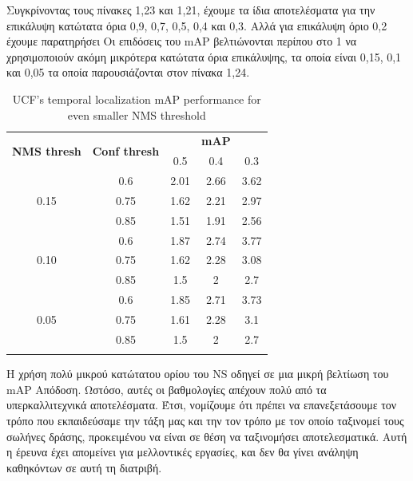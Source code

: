 \documentclass{report}
\begin{document}
Συγκρίνοντας τους πίνακες 1,23 και 1,21, έχουμε τα ίδια αποτελέσματα για την επικάλυψη
κατώτατα όρια 0,9, 0,7, 0,5, 0,4 και 0,3. Αλλά για επικάλυψη όριο 0,2 έχουμε παρατηρήσει
Οι επιδόσεις του mAP βελτιώνονται περίπου στο 1%
να χρησιμοποιούν ακόμη μικρότερα κατώτατα όρια επικάλυψης, τα οποία είναι 0,15, 0,1 και 0,05 τα οποία
παρουσιάζονται στον πίνακα 1,24.

\begin{center}
  \begin{longtable}{|| c | c | c c c||}
    \hline
    \multirow{2}{*}{\textbf{NMS thresh}} & \multirow{2}{*}{\textbf{Conf thresh}} & {} & \textbf{mAP} & {} \\
    {} & {} & 0.5 & 0.4 & 0.3 \\
    \hline
    \multirow{3}{*}{0.15} & 0.6 & 2.01 & 2.66 & 3.62 \\
    \cline{2-5}
    {} & 0.75 & 1.62 & 2.21 & 2.97 \\
    \cline{2-5}
    {} & 0.85 & 1.51 & 1.91 & 2.56 \\
    \hline
    \multirow{3}{*}{0.10} & 0.6 & 1.87 & 2.74 & 3.77 \\
    \cline{2-5}
    {} & 0.75 & 1.62 & 2.28 & 3.08  \\
    \cline{2-5}
    {} & 0.85 & 1.5 & 2 & 2.7  \\
    \hline
    \multirow{3}{*}{0.05} & 0.6 & 1.85 & 2.71 & 3.73  \\
    \cline{2-5}
    {} & 0.75 & 1.61 & 2.28 & 3.1  \\
    \cline{2-5}
    {} & 0.85 & 1.5 & 2 & 2.7 \\
    \hline

    \caption{UCF's temporal localization mAP performance for even smaller NMS threshold}
    \label{table:temp_cls_2_1}

  \end{longtable}
\end{center}

Η χρήση πολύ μικρού κατώτατου ορίου του ΝS οδηγεί σε μια μικρή βελτίωση του mAP
Απόδοση. Ωστόσο, αυτές οι βαθμολογίες απέχουν πολύ από τα υπερκαλλιτεχνικά αποτελέσματα.
Έτσι, νομίζουμε ότι πρέπει να επανεξετάσουμε τον τρόπο που εκπαιδεύσαμε την τάξη μας και την
τον τρόπο με τον οποίο ταξινομεί τους σωλήνες δράσης, προκειμένου να είναι σε θέση να ταξινομήσει αποτελεσματικά.
Αυτή η έρευνα έχει απομείνει για μελλοντικές εργασίες, και δεν θα γίνει ανάληψη καθηκόντων σε αυτή τη διατριβή.
\end{document}
